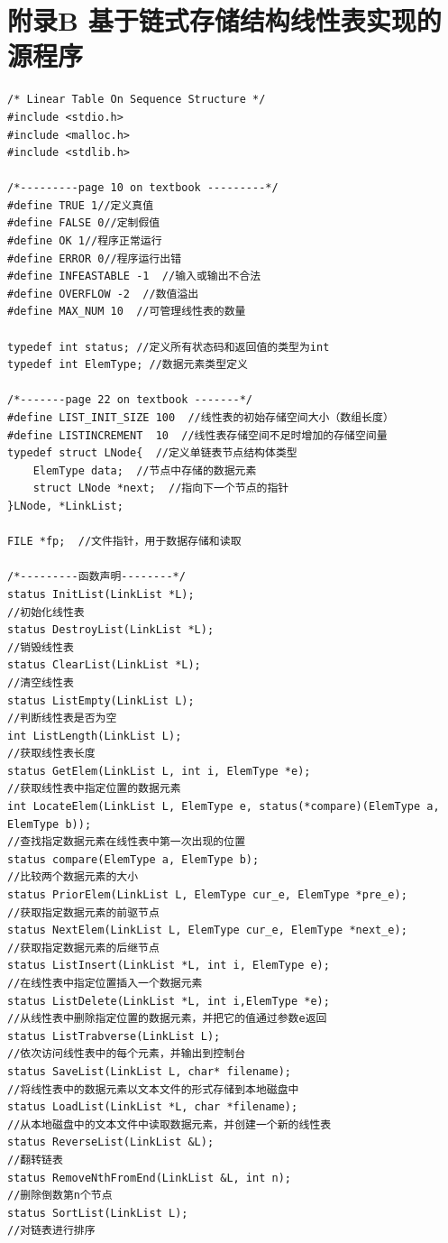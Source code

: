 \documentclass[supercite]{Experimental_Report}
\theoremstyle{definition}
\begin{document}
\section{附录B 基于链式存储结构线性表实现的源程序}
\begin{lstlisting}[title =相关定义,frame=none]
/* Linear Table On Sequence Structure */
#include <stdio.h>
#include <malloc.h>
#include <stdlib.h>

/*---------page 10 on textbook ---------*/
#define TRUE 1//定义真值 
#define FALSE 0//定制假值 
#define OK 1//程序正常运行 
#define ERROR 0//程序运行出错 
#define INFEASTABLE -1  //输入或输出不合法
#define OVERFLOW -2  //数值溢出 
#define MAX_NUM 10  //可管理线性表的数量

typedef int status; //定义所有状态码和返回值的类型为int
typedef int ElemType; //数据元素类型定义

/*-------page 22 on textbook -------*/
#define LIST_INIT_SIZE 100  //线性表的初始存储空间大小（数组长度）
#define LISTINCREMENT  10  //线性表存储空间不足时增加的存储空间量
typedef struct LNode{  //定义单链表节点结构体类型
	ElemType data;  //节点中存储的数据元素
	struct LNode *next;  //指向下一个节点的指针
}LNode, *LinkList;

FILE *fp;  //文件指针，用于数据存储和读取

/*---------函数声明--------*/
status InitList(LinkList *L);
//初始化线性表
status DestroyList(LinkList *L);
//销毁线性表
status ClearList(LinkList *L);
//清空线性表
status ListEmpty(LinkList L);
//判断线性表是否为空
int ListLength(LinkList L);
//获取线性表长度 
status GetElem(LinkList L, int i, ElemType *e);
//获取线性表中指定位置的数据元素
int LocateElem(LinkList L, ElemType e, status(*compare)(ElemType a, ElemType b));
//查找指定数据元素在线性表中第一次出现的位置
status compare(ElemType a, ElemType b);
//比较两个数据元素的大小
status PriorElem(LinkList L, ElemType cur_e, ElemType *pre_e);
//获取指定数据元素的前驱节点
status NextElem(LinkList L, ElemType cur_e, ElemType *next_e);
//获取指定数据元素的后继节点
status ListInsert(LinkList *L, int i, ElemType e);
//在线性表中指定位置插入一个数据元素
status ListDelete(LinkList *L, int i,ElemType *e);
//从线性表中删除指定位置的数据元素，并把它的值通过参数e返回
status ListTrabverse(LinkList L);
//依次访问线性表中的每个元素，并输出到控制台
status SaveList(LinkList L, char* filename);
//将线性表中的数据元素以文本文件的形式存储到本地磁盘中
status LoadList(LinkList *L, char *filename);
//从本地磁盘中的文本文件中读取数据元素，并创建一个新的线性表
status ReverseList(LinkList &L);
//翻转链表
status RemoveNthFromEnd(LinkList &L, int n);
//删除倒数第n个节点
status SortList(LinkList L);
//对链表进行排序
\end{lstlisting}
\end{document}
